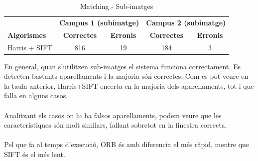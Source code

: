 		\begin{table}[H]
			\begin{center}
				\begin{tabular}{l | c c | c c}
					& \multicolumn{2}{c|}{\textbf{Campus 1 (subimatge)}} & \multicolumn{2}{c}{\textbf{Campus 2 (subimatge)}} \\
					\textbf{Algorismes} & \textbf{Correctes} & \textbf{Erronis} & \textbf{Correctes} & \textbf{Erronis} \\ \hline
					Harris + SIFT & 816 & 19 & 184 & 3 \\
				\end{tabular}
			\end{center}
			\caption{Matching - Sub-imatges}
		\end{table}

		\noindent
		En general, quan s'utilitzen sub-imatges el sistema funciona correctament. Es detecten bastants aparellaments i la majoria són correctes. Com es pot veure en la taula anterior,
		Harris+SIFT encerta en la majoria dels aparellaments, tot i que falla en alguns casos.\\\\
		Analitzant els casos on hi ha falsos aparellaments, podem veure que les característiques són molt similars, fallant sobretot en la finestra correcta.\\\\
		Pel que fa al temps d'execució, ORB és amb diferencia el més ràpid, mentre que SIFT és el més lent.\\

